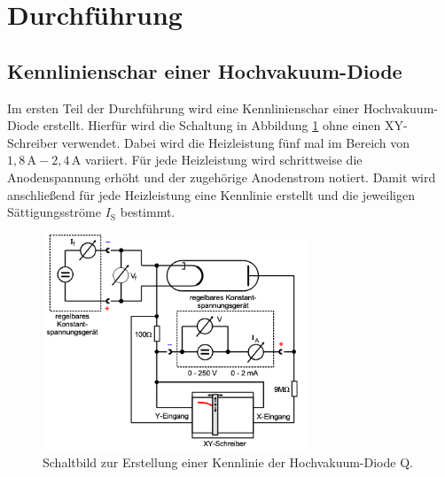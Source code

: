 \section{Durchführung}
\label{sec:Durchführung}
\subsection{Kennlinienschar einer Hochvakuum-Diode}
Im ersten Teil der Durchführung wird eine Kennlinienschar einer Hochvakuum-Diode erstellt. 
Hierfür wird die Schaltung in Abbildung \ref{fig:ersteApparatur} ohne einen XY-Schreiber verwendet.
Dabei wird die Heizleistung fünf mal im Bereich von $1,8\,\unit{\ampere} - 2,4\,\unit{\ampere}$ variiert. 
Für jede Heizleistung wird schrittweise die Anodenspannung erhöht und der zugehörige Anodenstrom notiert. 
Damit wird anschließend für jede Heizleistung eine Kennlinie erstellt und die jeweiligen Sättigungsströme $I_{\text{S}}$
bestimmt.
\begin{figure}[H]
    \centering
    \includegraphics[width=0.7\textwidth]{content/Bilder/ersterAufbau.png}
    \caption{Schaltbild zur Erstellung einer Kennlinie der Hochvakuum-Diode Q\cite{anleitungV504}.}
    \label{fig:ersteApparatur}
\end{figure}

